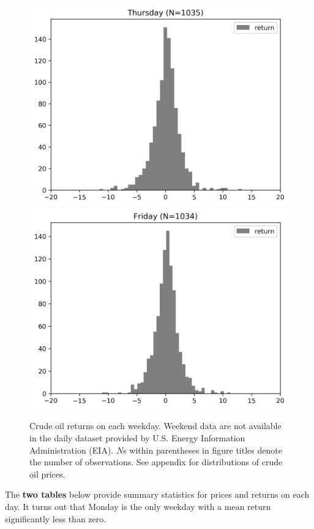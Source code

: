 \documentclass[12pt]{article}
\begin{document}
\begin{figure}[H]
		\includegraphics[width=0.45\linewidth]{figures/day_of_week_effect/dist_returns_Thursday.png}
		\includegraphics[width=0.45\linewidth]{figures/day_of_week_effect/dist_returns_Friday.png}
		\caption{Crude oil returns on each weekday. Weekend data are not available in the daily dataset provided by U.S. Energy Information Administration (EIA). $N$s within parentheses in figure titles denote the number of observations. See appendix for distributions of crude oil prices.}
	\end{figure}

	\par The \textbf{two tables} below provide summary statistics for prices and returns on each day. It turns out that Monday is the only weekday with a mean return significantly less than zero.
\end{document}
